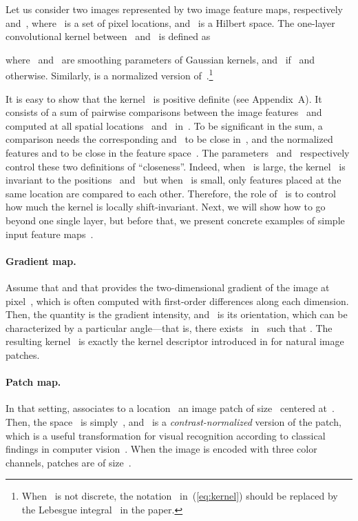 \begin{definition} \label{def:scattering}
   Let us consider two images represented by two
   image feature maps, respectively~ and~,
   where~ is a set of pixel locations, and~ is a Hilbert space.
   The one-layer convolutional kernel between~ and~ is defined as 
  
  where~ and~ are smoothing parameters of Gaussian kernels,
  and~ if~ and~ otherwise.
  Similarly,  is a normalized version of~.\footnote{When~ is not discrete, the notation~ in~(\ref{eq:kernel}) should be replaced by the Lebesgue integral~ in the paper.}
\end{definition}
\vspace*{-0.1cm}
It is easy to show that the kernel~ is positive definite (see Appendix~A). It consists of a sum of pairwise
comparisons between the image features~ and~ computed at
all spatial locations~ and~ in~. To be significant in the sum, a
comparison needs the corresponding  and~ to be close 
in~, and the normalized features  and
 to be close in the feature space~. 
The parameters~ and~ respectively control these two definitions
of ``closeness''. Indeed, when~
is large, the kernel~ is invariant to the positions~ and~ but
when~ is small, only features placed at the same location  are
compared to each other. Therefore, the role of~ is to control how much the kernel
is locally shift-invariant. Next, we will show how to go beyond one single
layer, but before that, we present concrete examples of simple input
feature maps~.
\vs
\paragraph{Gradient map.} Assume that  and that
 provides the two-dimensional gradient of the image at
pixel~, which is often computed with first-order differences along each
dimension. Then, the quantity  is the gradient intensity, and~ is its orientation,
which can be characterized by a particular angle---that is, there exists~
in~ such that . The
resulting kernel~ is exactly the kernel descriptor introduced in
\cite{bo2011,bo2010} for natural image patches.

\vs
\paragraph{Patch map.} In that setting,  associates to a
location~ an image patch of size~ centered at~.
Then, the space~ is simply~, and~ is a \emph{contrast-normalized}
version of the patch, which is a useful transformation for visual recognition according
to classical findings in computer vision~\cite{jarrett2009}. When the
image is encoded with three color channels, patches are of size~.

